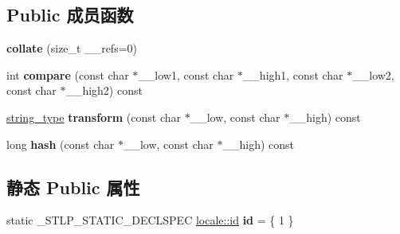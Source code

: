 \subsection*{Public 成员函数}
\begin{DoxyCompactItemize}
\item 
\mbox{\label{classcollate_3_01char_01_4_ad60034dbf3d7655975fb5777d7316c84}} 
{\bfseries collate} (size\+\_\+t \+\_\+\+\_\+refs=0)
\item 
\mbox{\label{classcollate_3_01char_01_4_a3bc3c99f7315ff596d684e50d021395c}} 
int {\bfseries compare} (const char $\ast$\+\_\+\+\_\+low1, const char $\ast$\+\_\+\+\_\+high1, const char $\ast$\+\_\+\+\_\+low2, const char $\ast$\+\_\+\+\_\+high2) const
\item 
\mbox{\label{classcollate_3_01char_01_4_a7c3e66bfaf55ed7515b03019716e20cf}} 
\hyperlink{structstring}{string\+\_\+type} {\bfseries transform} (const char $\ast$\+\_\+\+\_\+low, const char $\ast$\+\_\+\+\_\+high) const
\item 
\mbox{\label{classcollate_3_01char_01_4_a0fccd335908abce95be03505f583fc39}} 
long {\bfseries hash} (const char $\ast$\+\_\+\+\_\+low, const char $\ast$\+\_\+\+\_\+high) const
\end{DoxyCompactItemize}
\subsection*{静态 Public 属性}
\begin{DoxyCompactItemize}
\item 
\mbox{\label{classcollate_3_01char_01_4_a45941bed290ebe9704f268929505856e}} 
static \+\_\+\+S\+T\+L\+P\+\_\+\+S\+T\+A\+T\+I\+C\+\_\+\+D\+E\+C\+L\+S\+P\+EC \hyperlink{classlocale_1_1id}{locale\+::id} {\bfseries id} = \{ 1 \}
\end{DoxyCompactItemize}
